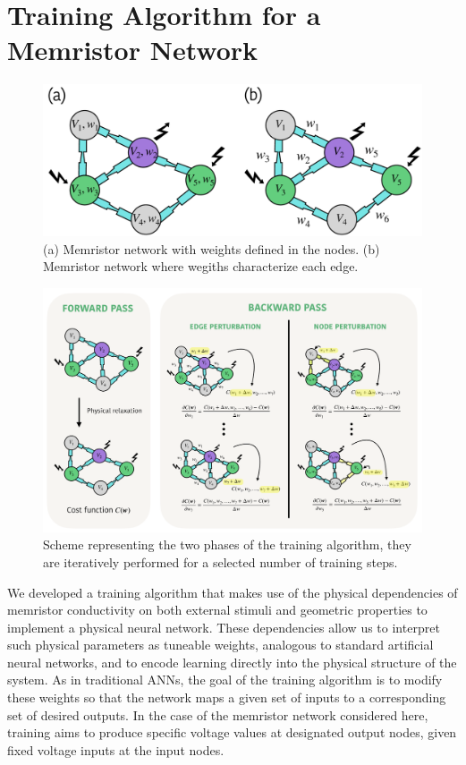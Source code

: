 \documentclass[reprint,superscriptaddress,prb,showkeys]{revtex4-2}
\begin{document}
\section{\label{sec:training}Training Algorithm for a Memristor Network}
\begin{figure}[b]
    \centering
    \includegraphics[width=0.8\columnwidth]{plots/training/two_types_weights.pdf}
    \caption{(a) Memristor network with weights defined in the nodes. (b) Memristor network where wegiths characterize each edge.}
    \label{fig:two_types_weights}
\end{figure} 
\begin{figure}[t] 
    \centering
    \includegraphics[width=\textwidth]{plots/training/training_scheme.pdf}
    \caption{Scheme representing the two phases of the training algorithm, they are iteratively performed for a selected number of training steps.}
    \label{fig:training_scheme}
\end{figure}
We developed a training algorithm that makes use of the physical dependencies of memristor conductivity on both external stimuli and geometric properties to implement a physical neural network. These dependencies allow us to interpret such physical parameters as tuneable weights, analogous to standard artificial neural networks, and to encode learning directly into the physical structure of the system. As in traditional ANNs, the goal of the training algorithm is to modify these weights so that the network maps a given set of inputs to a corresponding set of desired outputs. In the case of the memristor network considered here, training aims to produce specific voltage values at designated output nodes, given fixed voltage inputs at the input nodes.
\end{document}
